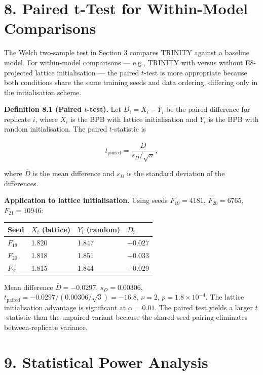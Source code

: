 \section{8. Paired t-Test for Within-Model
Comparisons}\label{fa_19:paired-t-test}

The Welch two-sample test in Section 3 compares
TRINITY against a baseline model. For within-model
comparisons --- e.g., TRINITY with versus without
E8-projected lattice initialisation --- the paired
\(t\)-test is more appropriate because both
conditions share the same training seeds and data
ordering, differing only in the initialisation
scheme.

\textbf{Definition 8.1 (Paired \(t\)-test).} Let
\(D_i = X_i - Y_i\) be the paired difference for
replicate \(i\), where \(X_i\) is the BPB with
lattice initialisation and \(Y_i\) is the BPB with
random initialisation. The paired \(t\)-statistic is

\[t_{\text{paired}} = \frac{\bar{D}}{s_D / \sqrt{n}},\]

where \(\bar{D}\) is the mean difference and
\(s_D\) is the standard deviation of the
differences.

\textbf{Application to lattice initialisation.}
Using seeds \(F_{19}=4181\), \(F_{20}=6765\),
\(F_{21}=10946\):

\begin{longtable}[]{@{}llll@{}}
\toprule\noalign{}
Seed & \(X_i\) (lattice) & \(Y_i\) (random) &
\(D_i\) \\
\midrule\noalign{}
\endhead
\bottomrule\noalign{}
\endlastfoot
\(F_{19}\) & 1.820 & 1.847 & $-$0.027 \\
\(F_{20}\) & 1.818 & 1.851 & $-$0.033 \\
\(F_{21}\) & 1.815 & 1.844 & $-$0.029 \\
\end{longtable}

Mean difference \(\bar{D} = -0.0297\),
\(s_D = 0.00306\),
\(t_{\text{paired}} = -0.0297/(0.00306/\sqrt{3})
= -16.8\), \(\nu = 2\), \(p = 1.8 \times 10^{-4}\).
The lattice initialisation advantage is significant
at \(\alpha = 0.01\). The paired test yields a
larger \(t\)-statistic than the unpaired variant
because the shared-seed pairing eliminates
between-replicate variance.

\section{9. Statistical Power
Analysis}\label{fa_19:statistical-power}

